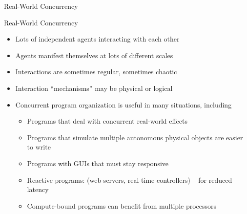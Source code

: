 \documentclass{concdistfoils}
\def\heading#1{\begin{cframed}[8.8in]{#1}\end{cframed}}
\begin{document}
\begin{section}{Real-World Concurrency}
\begin{slide}
\heading{Real-World Concurrency}

\begin{itemize}
\item Lots of independent agents interacting with each other
\item Agents manifest themselves at lots of different scales
\item Interactions are sometimes regular, sometimes chaotic
\item Interaction ``mechanisms'' may be physical or logical

\end{itemize}
\vfill
\begin{center}
\end{center}
\end{slide}

\begin{slide}
\begin{itemize}
\item Concurrent program organization is useful in many situations, including
\begin{itemize}
\item Programs that deal with concurrent real-world effects
\item Programs that simulate multiple autonomous physical objects are easier to write
\item Programs with GUIs that must stay responsive
\item Reactive programs: (web-servers, real-time controllers) -- for reduced latency
\item Compute-bound programs can benefit from multiple processors
\end{itemize}
\end{itemize}
\end{slide}


\end{section}
\end{document}
